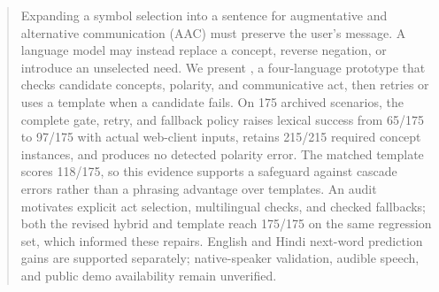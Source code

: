 \begin{abstract}
Expanding a symbol selection into a sentence for augmentative and alternative communication (AAC) must preserve the user's message.
A language model may instead replace a concept, reverse negation, or introduce an unselected need.
We present \sys{}, a four-language prototype that checks candidate concepts, polarity, and communicative act, then retries or uses a template when a candidate fails.
On 175 archived scenarios, the complete gate, retry, and fallback policy raises lexical success from 65/175 to 97/175 with actual web-client inputs, retains 215/215 required concept instances, and produces no detected polarity error.
The matched template scores 118/175, so this evidence supports a safeguard against cascade errors rather than a phrasing advantage over templates.
An audit motivates explicit act selection, multilingual checks, and checked fallbacks; both the revised hybrid and template reach 175/175 on the same regression set, which informed these repairs.
English and Hindi next-word prediction gains are supported separately; native-speaker validation, audible speech, and public demo availability remain unverified.
\end{abstract}
